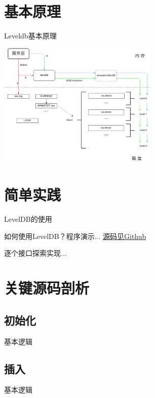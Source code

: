 \documentclass[CJK]{beamer}
\begin{document}
\begin{CJK*}{UTF8}{gkai}
\section{基本原理}
\begin{frame}{Leveldb基本原理}
\begin{center}
\includegraphics[height=6cm]{leveldb-arch-diagram.png}
\end{center}
\end{frame}

\section{简单实践}
\begin{frame}{LevelDB的使用}
\begin{block}{}
如何使用LevelDB？程序演示... {\color{blue}\href{https://github.com/HappyTechGroup/1st-phase/tree/master/leveldb/code}{源码见Github}}

逐个接口探索实现...
\end{block}
\end{frame}

\section{关键源码剖析}

\subsection{初始化}
\begin{frame}{基本逻辑}

\end{frame}

\subsection{插入}
\begin{frame}{基本逻辑}
\end{frame}


\end{CJK*}
\end{document}
